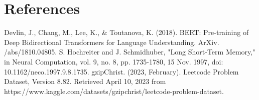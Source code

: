 \documentclass{article}
\begin{document}
%
%
%
%
%
%
%

\section*{References}
{
\small

\begin{thebibliography}{9}
Devlin, J., Chang, M., Lee, K., \& Toutanova, K. (2018). BERT: Pre-training of Deep Bidirectional Transformers for Language Understanding. ArXiv. /abs/1810.04805.
S. Hochreiter and J. Schmidhuber, "Long Short-Term Memory," in Neural Computation, vol. 9, no. 8, pp. 1735-1780, 15 Nov. 1997, doi: 10.1162/neco.1997.9.8.1735.
gzipChrist. (2023, February). Leetcode Problem Dataset, Version 8.82. Retrieved April 10, 2023 from https://www.kaggle.com/datasets/gzipchrist/leetcode-problem-dataset.
\end{thebibliography}
}
\end{document}
